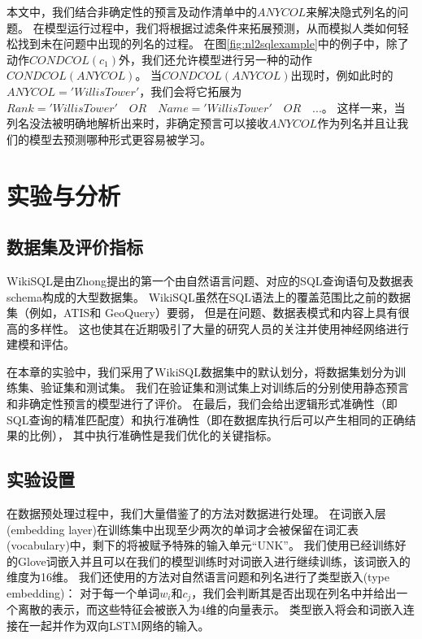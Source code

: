 本文中，我们结合非确定性的预言及动作清单中的$ANYCOL$来解决隐式列名的问题。
在模型运行过程中，我们将根据过滤条件来拓展预测，从而模拟人类如何轻松找到未在问题中出现的列名的过程。
在图\ref{fig:nl2sqlexample}中的例子中，除了动作$CONDCOL(c_1)$外，我们还允许模型进行另一种的动作$CONDCOL(ANYCOL)$。
当$CONDCOL(ANYCOL)$出现时，例如此时的$ANYCOL='Willis Tower'$，我们会将它拓展为$Rank='Willis Tower' \quad OR \quad Name='Willis Tower' \quad OR \quad ...$。
这样一来，当列名没法被明确地解析出来时，非确定预言可以接收$ANYCOL$作为列名并且让我们的模型去预测哪种形式更容易被学习。


\section{实验与分析}
\subsection{数据集及评价指标}
WikiSQL是由Zhong\cite{zhong2017seq2sql}提出的第一个由自然语言问题、对应的SQL查询语句及数据表schema构成的大型数据集。
WikiSQL虽然在SQL语法上的覆盖范围比之前的数据集（例如，ATIS\cite{price1990evaluation,Dahl1994Expanding}和 GeoQuery\cite{Zelle2008Learning}）要弱，
但是在问题、数据表模式和内容上具有很高的多样性。
这也使其在近期吸引了大量的研究人员的关注并使用神经网络进行建模和评估\cite{zhong2017seq2sql,dong2016language,xu2017sqlnet,yu2018typesql,wang2018pointing,huang2018natural,wang2018execution}。

在本章的实验中，我们采用了WikiSQL数据集中的默认划分，将数据集划分为训练集、验证集和测试集。
我们在验证集和测试集上对训练后的分别使用静态预言和非确定性预言的模型进行了评价。
在最后，我们会给出逻辑形式准确性（即SQL查询的精准匹配度）和执行准确性（即在数据库执行后可以产生相同的正确结果的比例），
其中执行准确性是我们优化的关键指标。


\subsection{实验设置}
在数据预处理过程中，我们大量借鉴了\cite{dong2018coarse}的方法对数据进行处理。
在词嵌入层(embedding layer)在训练集中出现至少两次的单词才会被保留在词汇表(vocabulary)中，剩下的将被赋予特殊的输入单元“UNK”。
我们使用已经训练好的Glove词嵌入\cite{pennington2014glove}并且可以在我们的模型训练时对词嵌入进行继续训练，该词嵌入的维度为16维。
我们还使用\cite{yu2018typesql}的方法对自然语言问题和列名进行了类型嵌入(type embedding)：
对于每一个单词$w_i$和$c_j$，我们会判断其是否出现在列名中并给出一个离散的表示，而这些特征会被嵌入为4维的向量表示。
类型嵌入将会和词嵌入连接在一起并作为双向LSTM网络的输入。

